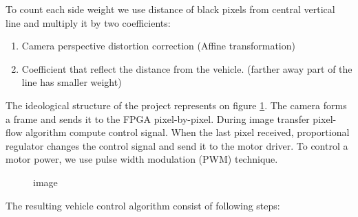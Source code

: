 \documentclass[a4paper,12pt]{article} %
\renewcommand{\labelenumii}{\arabic{enumi}.\arabic{enumii}.}
\begin{document}
\begin{enumerate}
	To count each side weight we use distance of black pixels from central vertical line and  multiply it by two coefficients:
	
	\renewcommand{\labelenumii}{\arabic{enumii}.}
	
	\begin{enumerate}
		\item Camera perspective distortion correction (Affine transformation)
		
		\item Coefficient that reflect the distance from the vehicle. (farther away part of the line has smaller weight)
	\end{enumerate}
	
	\renewcommand{\labelenumii}{\arabic{enumi}.\arabic{enumii}.}
	
	The ideological structure of the project represents on figure \ref{fig:diagram}. The camera forms a frame and sends it to the FPGA pixel-by-pixel. During image transfer pixel-flow algorithm compute control signal. When the last pixel received, proportional regulator changes the control signal and send it to the motor driver. To control a motor power, we use pulse width modulation (PWM) technique. 
	
	\begin{figure}[h]
		\caption{image}
		\label{fig:diagram}
	\end{figure}
	
	\newpage
	The resulting vehicle control algorithm consist of following steps:
	\renewcommand{\labelenumii}{\roman{enumii}.} 
	

\end{enumerate}
\end{document}
